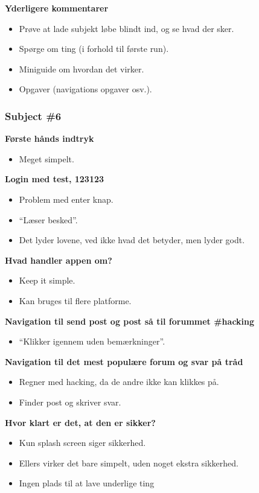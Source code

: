 \noindent\textbf{Yderligere kommentarer}
\begin{itemize}
    \item Prøve at lade subjekt løbe blindt ind, og se hvad der sker.
    \item Spørge om ting (i forhold til første run).
    \item Miniguide om hvordan det virker.
    \item Opgaver (navigations opgaver osv.).
\end{itemize}

\subsubsection{Subject \#6}

\noindent\textbf{Første hånds indtryk}
\begin{itemize}
    \item Meget simpelt.
\end{itemize}

\noindent\textbf{Login med test, 123123}
\begin{itemize}
    \item Problem med enter knap.
    \item “Læser besked”.
    \item Det lyder lovene, ved ikke hvad det betyder, men lyder godt.
\end{itemize}

\noindent\textbf{Hvad handler appen om?}
\begin{itemize}
    \item Keep it simple.
    \item Kan bruges til flere platforme.
\end{itemize}

\noindent\textbf{Navigation til send post og post så til forummet \#hacking}
\begin{itemize}
    \item “Klikker igennem uden bemærkninger”.
\end{itemize}

\noindent\textbf{Navigation til det mest populære forum og svar på tråd}
\begin{itemize}
    \item Regner med hacking, da de andre ikke kan klikkes på.
    \item Finder post og skriver svar.
\end{itemize}

\noindent\textbf{Hvor klart er det, at den er sikker?}
\begin{itemize}
    \item Kun splash screen siger sikkerhed.
    \item Ellers virker det bare simpelt, uden noget ekstra sikkerhed.
    \item Ingen plads til at lave underlige ting
\end{itemize}

